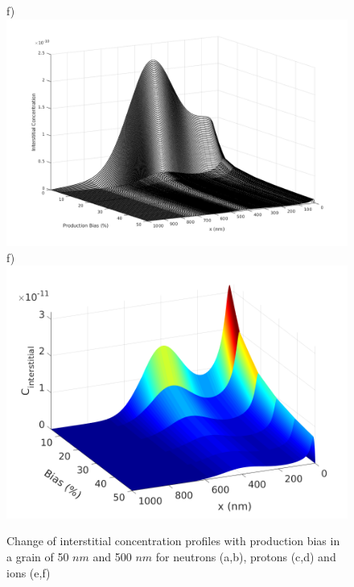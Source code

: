 \documentclass[utf8]{frontiersSCNS} %
\begin{document}
\begin{figure}[htb!]
        f)\includegraphics[scale=0.3]{data_ion_1000nm_grey}
        f)\includegraphics[scale=0.33]{data_ion_1000nm}
        \caption{Change of interstitial concentration profiles with production bias in a grain of 50 $nm$ and 500 $nm$ for neutrons (a,b), protons (c,d) and ions (e,f)}
        \label{figure:3D_concentrations_neutron_1e-6}
    \end{figure}
\end{document}

